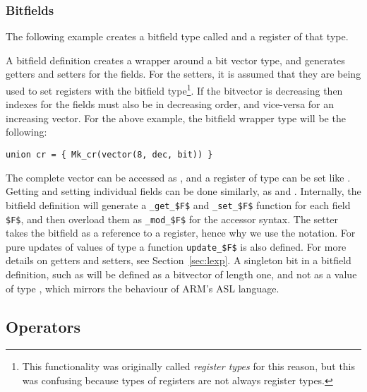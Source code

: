 \subsubsection{Bitfields}
\label{sec:bitfield}

The following example creates a bitfield type called  and a
register  of that type.



A bitfield definition creates a wrapper around a bit vector type, and
generates getters and setters for the fields. For the setters, it is
assumed that they are being used to set registers with the bitfield
type\footnote{This functionality was originally called \emph{register
    types} for this reason, but this was confusing because types of
  registers are not always register types.}. If the bitvector is
decreasing then indexes for the fields must also be in decreasing
order, and vice-versa for an increasing vector. For the above example,
the bitfield wrapper type will be the following:

\begin{lstlisting}
union cr = { Mk_cr(vector(8, dec, bit)) }
\end{lstlisting}

The complete vector can be accessed as , and a register
of type  can be set like . Getting and
setting individual fields can be done similarly, as  and
. Internally, the bitfield definition will
generate a \lstinline[mathescape]{_get_$F$} and
\lstinline[mathescape]{_set_$F$} function for each field
\lstinline[mathescape]{$F$}, and then overload them as
\lstinline[mathescape]{_mod_$F$} for the accessor syntax. The setter
takes the bitfield as a reference to a register, hence why we use the
\ll{->} notation. For pure updates of values of type  a
function \lstinline[mathescape]{update_$F$} is also defined. For more
details on getters and setters, see Section~\ref{sec:lexp}. A
singleton bit in a bitfield definition, such as  will be
defined as a bitvector of length one, and not as a value of type
, which mirrors the behaviour of ARM's ASL language.

\subsection{Operators}

